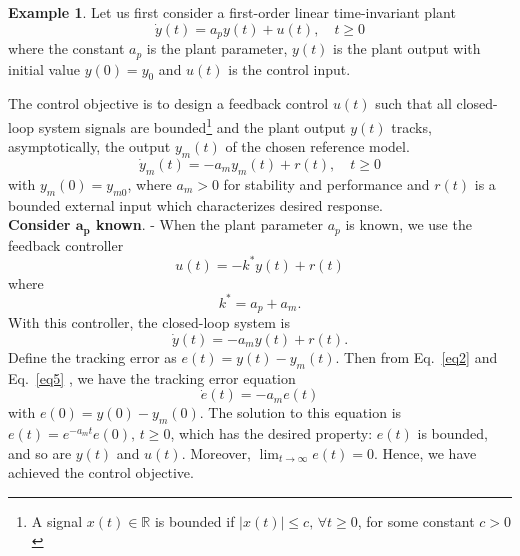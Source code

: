 \documentclass[11pt,a4paper,oneside]{book}
\numberwithin{equation}{section}
\theoremstyle{it}
\theoremstyle{definition}
\newtheorem{example}{Example}[chapter]
\begin{document}
\begin{example}
	Let us first consider a first-order linear time-invariant plant
	\begin{equation}\label{eq1}
		\dot{y}(t)=a_py(t)+u(t), \quad t\ge0
	\end{equation}
	where the constant $a_p$ is the plant parameter, $y(t)$ is the plant output with initial value $y(0)=y_0$ and $u(t)$ is the control input.
	
	The control objective is to design a feedback control $u(t)$ such that all closed-loop system signals are bounded\footnote{A signal $x(t)\in\mathbb{R}$ is bounded if $|x(t)|\le c,\,\forall t\ge0$, for some constant $c>0$} and the plant output $y(t)$ tracks, asymptotically, the output $y_m(t)$ of the chosen reference model.
	\begin{equation}\label{eq2}
		\dot{y}_m(t)=-a_my_m(t)+r(t), \quad t\ge0
	\end{equation}
	with $y_m(0)=y_{m0}$, where $a_m>0$ for stability and performance and $r(t)$ is a bounded external input which characterizes desired response. \\
	
	\textbf{Consider $\boldsymbol{a_p}$ known}. - When the plant parameter $a_p$ is known, we use the feedback controller 
	\begin{equation}\label{eq3}
		u(t)=-k^*y(t)+r(t)
	\end{equation}
	where 
	\begin{equation}\label{eq4}
		k^*= a_p+a_m.
	\end{equation}
	With this controller, the closed-loop system is 
	\begin{equation}\label{eq5}
		\dot{y}(t)=-a_my(t)+r(t).
	\end{equation}
	Define the tracking error as $e(t)=y(t)-y_m(t)$. Then from Eq.~\ref{eq2} and Eq.~\ref{eq5} , we have the tracking error equation 
	\begin{equation}\label{eq6}
		\dot{e}(t)=-a_me(t)
	\end{equation}
	with $e(0)=y(0)-y_m(0)$. The solution to this equation is $e(t)=e^{-a_mt}e(0),\,t\ge0$, which has the desired property: $e(t)$ is bounded, and so are $y(t)$ and $u(t)$. Moreover, $\lim_{t\rightarrow\infty}e(t)=0$. Hence, we have achieved the control objective. \\
	

\end{example}
\end{document}
